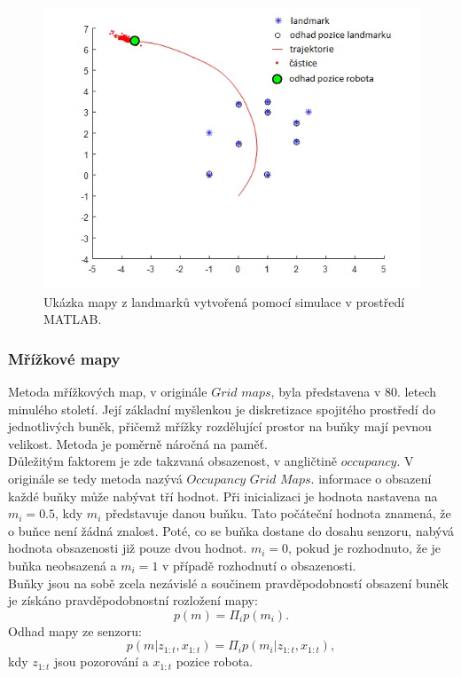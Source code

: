 \documentclass[12pt]{report}
\begin{document}
\begin{figure}[!ht]
	\begin{center}
		\includegraphics[width=0.7\columnwidth]{imgs/landmark_map.jpg}
	\end{center}
	\caption{Ukázka mapy z landmarků vytvořená pomocí simulace v prostředí MATLAB.}
	\label{fig:landmark_map}
\end{figure}
\newpage
\subsubsection{Mřížkové mapy}
Metoda mřížkových map, v originále $Grid$ $maps$, byla představena v 80. letech minulého století. Její základní myšlenkou je diskretizace spojitého prostředí do jednotlivých buněk, přičemž mřížky rozdělující prostor na buňky mají pevnou velikost. Metoda je poměrně náročná na paměť.\\
\indent Důležitým faktorem je zde takzvaná obsazenost, v angličtině $occupancy$. V originále se tedy metoda nazývá $Occupancy$ $Grid$ $Maps$. informace o obsazení každé buňky může nabývat tří hodnot. Při inicializaci je hodnota nastavena na $m_i=0.5$, kdy $m_i$ představuje danou buňku. Tato počáteční hodnota znamená, že o buňce není žádná znalost. Poté, co se buňka dostane do dosahu senzoru, nabývá hodnota obsazenosti již pouze dvou hodnot. $m_i=0$, pokud je rozhodnuto, že je buňka neobsazená a $m_i=1$ v případě rozhodnutí o obsazenosti.\\
\indent Buňky jsou na sobě zcela nezávislé a součinem pravděpodobností obsazení buněk je získáno pravděpodobnostní rozložení mapy:
\begin{equation}
	p(m)=\Pi_ip(m_i).
\end{equation}
Odhad mapy ze senzoru:
\begin{equation}
	p(m|z_{1:t},x_{1:t})=\Pi_ip(m_i|z_{1:t},x_{1:t}),
\end{equation}
kdy $z_{1:t}$ jsou pozorování a $x_{1:t}$ pozice robota.
\end{document}
